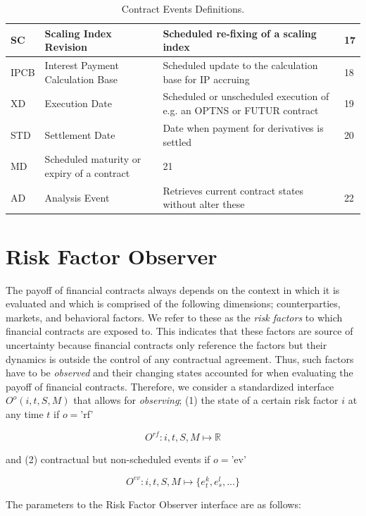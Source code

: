 \documentclass[9pt,oneside]{amsart}
\newcommand{\Real}{\mathbb{R}}
\newcommand{\obsfull}[5]{O^{#1}(#2,#3,#4,#5)}
\newcommand{\obsfunc}[1]{O^{#1}}
\begin{document}
\begin{multicols}{2}
\begin{table}[H]
\begin{tabular}{| p{0.23in}p{0.7in}p{1.4in}p{0.2in} |}
	\hline
	SC & Scaling Index Revision & Scheduled re-fixing of a scaling index & 17 \\
	\hline
	IPCB & Interest Payment Calculation Base & Scheduled update to the calculation base for IP accruing & 18 \\
	\hline
	XD & Execution Date & Scheduled or unscheduled execution of e.g. an OPTNS or FUTUR contract & 19 \\
	\hline
	STD & Settlement Date & Date when payment for derivatives is settled & 20 \\
	\hline
	MD & Scheduled maturity or expiry of a contract & 21 \\
	\hline	
	AD & Analysis Event & Retrieves current contract states without alter these & 22 \\
	\hline
	\end{tabular}
	\caption{Contract Events Definitions.}
	\label{tbl:events}
\end{table}





\section{Risk Factor Observer}\label{rfobs}

The payoff of financial contracts always depends on the context in which it is evaluated and which is comprised of the following dimensions; counterparties, markets, and behavioral factors. We refer to these as the \textit{risk factors} to which financial contracts are exposed to. This indicates that these factors are source of uncertainty because financial contracts only reference the factors but their dynamics is outside the control of any contractual agreement. Thus, such factors have to be \textit{observed} and their changing states accounted for when evaluating the payoff of financial contracts. Therefore, we consider a standardized interface $\obsfull{o}{i}{t}{S}{M}$ that allows for \textit{observing}; (1) the state of a certain risk factor $i$ at any time $t$ if $o=$'rf'

\[
	\obsfunc{rf}: i,t,S,M \mapsto \Real
\]

and (2) contractual but non-scheduled events if $o=$'ev'

\[
	\obsfunc{ev}: i,t,S,M \mapsto \{e_t^{k},e_s^{l},...\}
\]

The parameters to the Risk Factor Observer interface are as follows:


\end{multicols}
\end{document}
